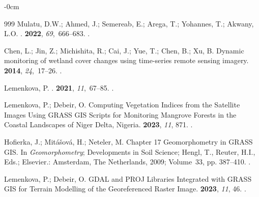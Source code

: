 \documentclass[analytics,article,accept,pdftex,moreauthors]{Definitions/mdpi}
\begin{document}
\begin{adjustwidth}{-\extralength}{0cm}
\begin{thebibliography}{999}
Mulatu, D.W.; Ahmed, J.; Semereab, E.; Arega, T.; Yohannes, T.; Akwany, L.O.
.
 {\bf 2022}, {\em 69},~666--683.
.

Chen, L.; Jin, Z.; Michishita, R.; Cai, J.; Yue, T.; Chen, B.; Xu, B.
\newblock Dynamic monitoring of wetland cover changes using time-series remote
  sensing imagery.
 {\bf 2014}, {\em 24},~17--26.
.

Lemenkova, P.
.
 {\bf 2021}, {\em 11},~67--85.
.

Lemenkova, P.; Debeir, O.
\newblock Computing Vegetation Indices from the Satellite Images Using GRASS
  GIS Scripts for Monitoring Mangrove Forests in the Coastal Landscapes of
  Niger Delta, Nigeria.
 {\bf 2023}, {\em 11}, 871.
.

\newpage  
{}
Hofierka, J.; Mitášová, H.; Neteler, M.
\newblock Chapter 17 Geomorphometry in GRASS GIS. In {\em Geomorphometry}; {Developments in
  Soil Science}; 
  Hengl, T., Reuter, H.I., Eds.; Elsevier.: Amsterdam, The Netherlands, %
  2009; Volume~33, pp. 387--410.
.

Lemenkova, P.; Debeir, O.
\newblock GDAL and PROJ Libraries Integrated with GRASS GIS for Terrain
  Modelling of the Georeferenced Raster Image.
 {\bf 2023}, {\em 11}, 46.
.


\end{thebibliography}
\end{adjustwidth}
\end{document}
